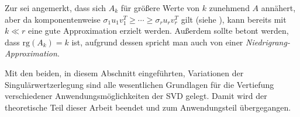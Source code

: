 Zur  sei angemerkt, dass sich \(A_k\) für größere Werte von \(k\) zunehmend \(A\) annähert, aber da komponentenweise \(\sigma_1 u_1 v^{T}_1 \geq \cdots \geq \sigma_r u_r v^{T}_r\) gilt (siehe ), kann bereits mit \(k \ll r\) eine gute Approximation erzielt werden. 
Außerdem sollte betont werden, dass \(\text{rg}(A_k)=k\) ist, aufgrund dessen spricht man auch von einer \textit{Niedrigrang-Approximation}.

Mit den beiden, in diesem Abschnitt eingeführten, Variationen der Singulärwertzerlegung sind alle wesentlichen Grundlagen für die Vertiefung verschiedener Anwendungsmöglichkeiten der SVD gelegt.
Damit wird der theoretische Teil dieser Arbeit beendet und zum Anwendungsteil übergegangen.
